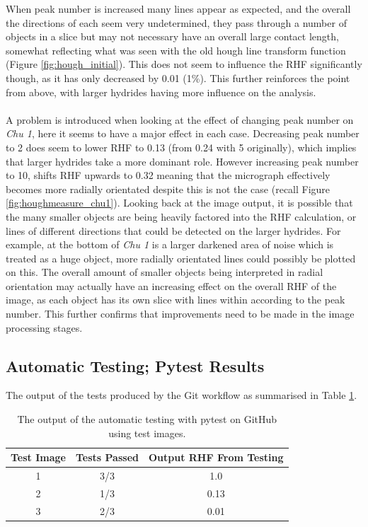 \documentclass{article}
\begin{document}
    When peak number is increased many lines appear as expected, and the overall the directions of each seem very undetermined, they pass through a number of objects in a slice but may not necessary have an overall large contact length, somewhat reflecting what was seen with the old hough line transform function (Figure \ref{fig:hough_initial}). This does not seem to influence the RHF significantly though, as it has only decreased by 0.01 (1\%). This further reinforces the point from above, with larger hydrides having more influence on the analysis.
    \\
    \\
    A problem is introduced when looking at the effect of changing peak number on \textit{Chu 1}, here it seems to have a major effect in each case. Decreasing peak number to 2 does seem to lower RHF to 0.13 (from 0.24 with 5 originally), which implies that larger hydrides take a more dominant role. However increasing peak number to 10, shifts RHF upwards to 0.32 meaning that the micrograph effectively becomes more radially orientated despite this is not the case (recall Figure \ref{fig:houghmeasure_chu1}). Looking back at the image output, it is possible that the many smaller objects are being heavily factored into the RHF calculation, or lines of different directions that could be detected on the larger hydrides. For example, at the bottom of \textit{Chu 1} is a larger darkened area of noise which is treated as a huge object, more radially orientated lines could possibly be plotted on this. The overall amount of smaller objects being interpreted in radial orientation may actually have an increasing effect on the overall RHF of the image, as each object has its own slice with lines within according to the peak number. This further confirms that improvements need to be made in the image processing stages. 
    
\subsection{Automatic Testing; Pytest Results}
    The output of the tests produced by the Git workflow as summarised in Table \ref{TestResults}.

    \begin{table}[h]
        \centering
        \begin{tabular}{|c|c|c|}
        \hline
            \textbf{Test Image} & \textbf{Tests Passed} & \textbf{Output RHF From Testing}  \\
            \hline
            1 & 3/3 & 1.0 \\
            \hline
            2 & 1/3 & 0.13 \\
            \hline
            3 & 2/3 & 0.01 \\
            \hline
        \end{tabular}
        \caption{The output of the automatic testing with pytest on GitHub using test images.}
        \label{TestResults}
    \end{table}
\end{document}
